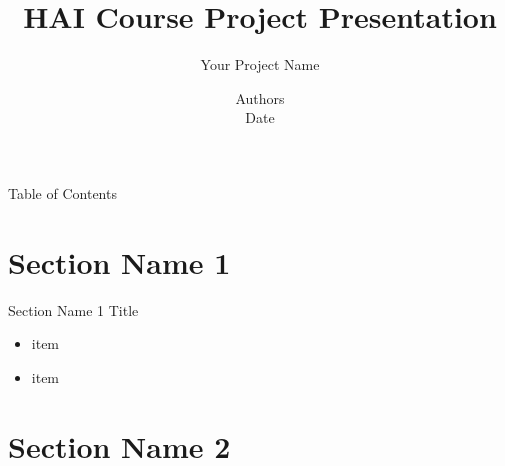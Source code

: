 \documentclass[aspectratio=169]{beamer}
\title[Beamer Presentation: Various Links]{HAI Course Project Presentation}
\subtitle{Your Project Name}
\author{Authors\\Date}
\institute{AI Thrust\\
HKUST (GZ)}
\begin{document}
\backgroundcanvas{}

\section[Outline]{}

\begin{frame}{Table of Contents}
	\tableofcontents
\end{frame}


\section{Section Name 1}

\begin{frame}[fragile]{Section Name 1}
Title
\begin{itemize}
\item item\\
\vspace{-5pt}
\item item\\
\end{itemize}
\end{frame}

\section{Section Name 2}
\end{document}
